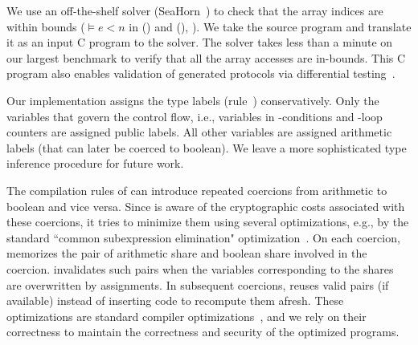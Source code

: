 We use an off-the-shelf solver
(SeaHorn~\cite{seahorn}) to check that the array indices
are within bounds ($\models e < n$
in ({}) and ({}),
). We take the \tool source program and
translate it as an input C program to the solver. The solver takes less
than a minute on our largest benchmark to verify that all the array
accesses are in-bounds. This C program also enables
validation of \tool generated protocols via differential testing~\cite{mckeeman,frigate}.

Our implementation assigns the type labels (rule~{})
conservatively. Only the variables that govern the control flow, i.e.,
variables in -conditions and -loop counters are
assigned public labels.
All other variables are assigned arithmetic labels (that can later be
coerced to boolean).
We leave a more sophisticated type inference procedure for future work.

The compilation rules of  can introduce
repeated coercions from arithmetic to
boolean and vice versa.
Since \tool is aware of the cryptographic costs associated with these coercions,
it tries to minimize them using several optimizations, e.g., by
the standard ``common subexpression elimination"
optimization~\cite{dragonbook}.
On each coercion, \tool memorizes the pair of arithmetic
share and boolean share involved in the coercion. 
\tool invalidates such pairs when the variables corresponding to the
shares are overwritten by assignments. 
In subsequent coercions, \tool  reuses valid pairs (if available)
instead of inserting code to recompute them afresh.
These optimizations are standard compiler
optimizations~\cite{dragonbook}, and we rely on their correctness to
maintain the correctness and security of the optimized programs.

